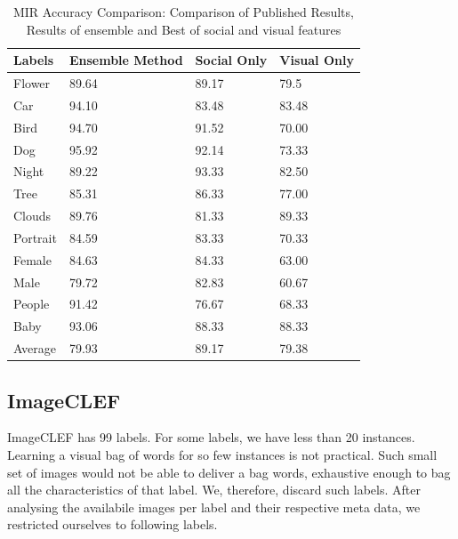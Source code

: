 \begin{table}
\centering
\caption{ MIR Accuracy Comparison: Comparison of Published Results, Results of ensemble and Best of social and visual features} %
\vspace*{0.2 cm}
\begin{tabular}{| p{2cm}| p{1.5cm}|p{1.2cm}|p{1.2cm}|} \hline
Labels & Ensemble Method & Social Only & Visual Only  \\  [1ex] \hline
Flower & 89.64 & 89.17 & 79.5 \\  [1ex] \hline
Car & 94.10 & 83.48 & 83.48 \\  [1ex] \hline
Bird & 94.70 & 91.52 & 70.00 \\  [1ex] \hline
Dog & 95.92 & 92.14 & 73.33 \\  [1ex] \hline
Night & 89.22 & 93.33 & 82.50 \\  [1ex] \hline
Tree & 85.31 & 86.33 & 77.00 \\  [1ex] \hline
Clouds & 89.76 & 81.33 & 89.33 \\  [1ex] \hline
Portrait & 84.59 & 83.33 & 70.33 \\  [1ex] \hline
Female & 84.63 & 84.33 & 63.00 \\  [1ex] \hline
Male & 79.72 & 82.83 & 60.67 \\  [1ex] \hline
People & 91.42 & 76.67 & 68.33 \\  [1ex] \hline
Baby & 93.06 & 88.33 & 88.33 \\  [1ex] \hline
Average & 79.93 & 89.17 & 79.38 \\  [1ex] \hline
\end{tabular}
 \label{MIRAccuracyOverAll} %
\end{table}




\subsection{ImageCLEF}
ImageCLEF has 99 labels. For some labels, we have less than 20 instances. Learning a visual bag of words for so few instances is not practical. Such small set of images would not be able to deliver a bag words, exhaustive enough to bag all the characteristics of that label. We, therefore, discard such labels. After analysing the availabile images per label and their respective meta data, we restricted ourselves to following labels. 

